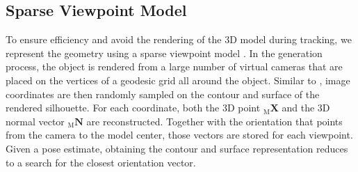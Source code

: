 \documentclass[10pt,twocolumn,letterpaper]{article}
\begin{document}
\subsection{Sparse Viewpoint Model}\label{ssec:p1}
To ensure efficiency and avoid the rendering of the 3D model during tracking, we represent the geometry using a sparse viewpoint model \cite{Stoiber2021}.
In the generation process, the object is rendered from a large number of virtual cameras that are placed on the vertices of a geodesic grid all around the object.
Similar to \cite{Tan2017}, image coordinates are then randomly sampled on the contour and surface of the rendered silhouette.
For each coordinate, both the 3D point ${}_\textrm{M}\pmb{X}$ and the 3D normal vector ${}_\textrm{M}\pmb{N}$ are reconstructed.
Together with the orientation that points from the camera to the model center, those vectors are stored for each viewpoint.
Given a pose estimate, obtaining the contour and surface representation reduces to a search for the closest orientation vector.
\end{document}
